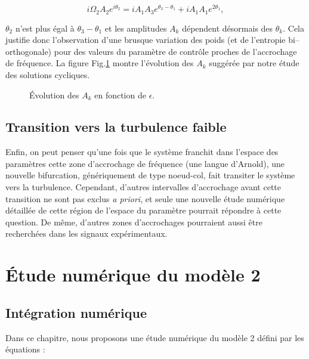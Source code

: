 \documentclass{book}
\begin{document}
\begin{equation}
i\Omega_2A_2e^{i\theta_2}=i A_1A_3e^{\theta_3-\theta_1}+i
A_1A_1e^{2\theta_1}, 
\end{equation}

$\theta_2$ n'est plus \'egal \`a $\theta_3-\theta_1$
et les amplitudes $A_k$ d\'ependent d\'esormais des  $\theta_k$.
Cela justifie donc l'observation d'une brusque variation des poids (et
de l'entropie bi--orthogonale) pour des valeurs du param\`etre de
contr\^ole proches de l'accrochage de fr\'equence. La figure
Fig.\ref{figampli} montre l'\'evolution des $A_k$ sugg\'er\'ee par notre
\'etude des solutions cycliques.



\begin{figure}[htb]
 \centerline{}   
 \caption{\'Evolution des $A_k$ en fonction de $\epsilon$.} 
 \label{figampli}
\end{figure}
%
%

\section{Transition vers la turbulence faible}
Enfin, on peut penser qu'une fois que le syst\`eme franchit dans
l'espace des param\`etres cette zone d'accrochage de fr\'equence (une
langue d'Arnold), une nouvelle bifurcation,
g\'en\'eriquement de type 
noeud-col, fait 
transiter le syst\`eme vers la turbulence. Cependant, d'autres
intervalles d'accrochage avant cette transition ne sont pas exclus
{\it a priori}, et seule une nouvelle \'etude num\'erique
d\'etaill\'ee de cette r\'egion de l'espace du param\`etre pourrait
r\'epondre \`a cette question.
De m\^eme, d'autres zones d'accrochages pourraient aussi \^etre
recherch\'ees 
dans les signaux exp\'erimentaux.


\chapter{\'Etude num\'erique du mod\`ele 2}\label{chapetudenum}



\section{Int\'egration num\'erique}
Dans ce chapitre, nous proposons une \'etude num\'erique du mod\`ele 2
d\'efini par les \'equations :
\end{document}
